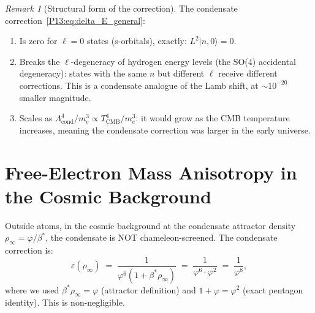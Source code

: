 \documentclass[11pt,a4paper]{article}
\theoremstyle{definition}
\theoremstyle{remark}
\newtheorem{remark}[theorem]{Remark}
\newcommand{\vp}{\varphi}
\newcommand{\bst}{\beta^{*}}
\newcommand{\TCMB}{T_{\mathrm{CMB}}}
\newcommand{\Lcond}{\Lambda_{\mathrm{cond}}}
\newcommand{\eps}{\varepsilon}
\newcommand{\rhoinf}{\rho_{\infty}}
\begin{document}
\begin{remark}[Structural form of the correction]
\label{P13:rem:structure}
The condensate correction~\eqref{P13:eq:delta_E_general}:
\begin{enumerate}[noitemsep]
\item Is zero for $\ell=0$ states (s-orbitals), exactly:
  $L^2|n,0\rangle = 0$.
\item Breaks the $\ell$-degeneracy of hydrogen energy levels
  (the SO(4) accidental degeneracy): states with the same $n$
  but different $\ell$ receive different corrections.
  This is a condensate analogue of the Lamb shift, at $\sim10^{-20}$
  smaller magnitude.
\item Scales as $\Lcond^4/m_e^3 \propto \TCMB^4/m_e^3$:
  it would grow as the CMB temperature increases, meaning the
  condensate correction was larger in the early universe.
\end{enumerate}
\end{remark}

\section{Free-Electron Mass Anisotropy in the Cosmic Background}
\label{P13:sec:anisotropy}

Outside atoms, in the cosmic background at the condensate attractor
density $\rhoinf = \vp/\bst$, the condensate is NOT chameleon-screened.
The condensate correction is:
\begin{equation}
  \boxed{\eps(\rhoinf)
  \;=\; \frac{1}{\vp^6(1+\bst\rhoinf)}
  \;=\; \frac{1}{\vp^6\cdot\vp^2}
  \;=\; \frac{1}{\vp^8},}
  \label{P13:eq:eps_attractor}
\end{equation}
where we used $\bst\rhoinf=\vp$ (attractor definition)
and $1+\vp=\vp^2$ (exact pentagon identity).
This is non-negligible.
\end{document}
